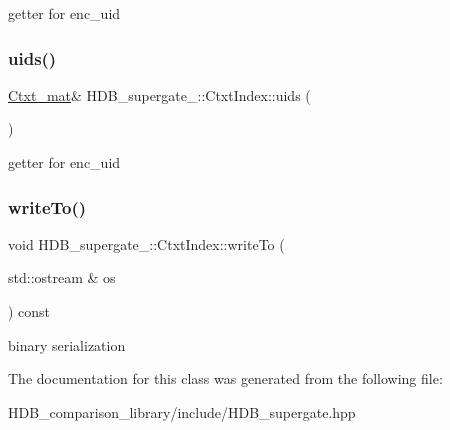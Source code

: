 getter for enc\+\_\+uid \mbox{\label{classHDB__supergate___1_1CtxtIndex_a928f500292b531aac98d86fb4e3511ec}} 
\subsubsection{\texorpdfstring{uids()}{uids()}\hspace{0.1cm}{\footnotesize\ttfamily [2/2]}}
{\footnotesize\ttfamily \hyperlink{namespaceHDB__supergate___a46a3fb2b98c95dc7615203376c4ad0c8}{Ctxt\+\_\+mat}\& H\+D\+B\+\_\+supergate\+\_\+\+::\+Ctxt\+Index\+::uids (\begin{DoxyParamCaption}{ }\end{DoxyParamCaption})\hspace{0.3cm}{\ttfamily [inline]}}

getter for enc\+\_\+uid \mbox{\label{classHDB__supergate___1_1CtxtIndex_a8766dc2600531ae78e8434df581eb42d}} 
\subsubsection{\texorpdfstring{write\+To()}{writeTo()}}
{\footnotesize\ttfamily void H\+D\+B\+\_\+supergate\+\_\+\+::\+Ctxt\+Index\+::write\+To (\begin{DoxyParamCaption}\item[{std\+::ostream \&}]{os }\end{DoxyParamCaption}) const}

binary serialization 

The documentation for this class was generated from the following file\+:\begin{DoxyCompactItemize}
\item 
H\+D\+B\+\_\+comparison\+\_\+library/include/H\+D\+B\+\_\+supergate.\+hpp\end{DoxyCompactItemize}
